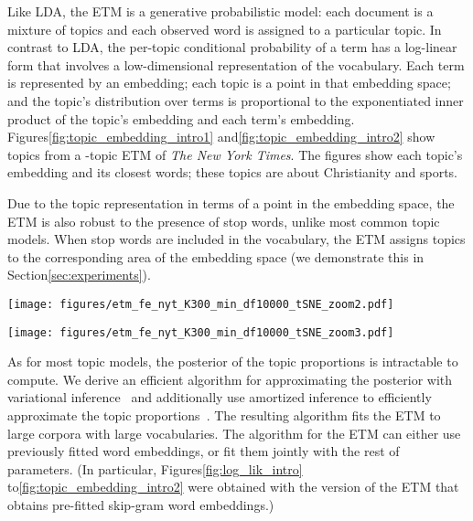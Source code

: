 \documentclass[11pt,a4paper]{article}
\begin{document}
Like \gls{LDA}, the \gls{ETM} is a generative probabilistic model:
each document is a mixture of topics and each observed word is
assigned to a particular topic.  In contrast to \gls{LDA},
the per-topic conditional probability of a term has a log-linear form
that involves a low-dimensional representation of the vocabulary.
Each term is represented by an embedding; each topic is a point in
that embedding space; and the topic's distribution over terms is
proportional to the exponentiated inner product of the topic's
embedding and each term's embedding.  Figures\nobreakspace \ref {fig:topic_embedding_intro1} and\nobreakspace  \ref {fig:topic_embedding_intro2}
show topics from a -topic \gls{ETM} of \textit{The New York Times}. The figures show each topic's embedding and its closest words; these topics are about Christianity and sports.

Due to the topic representation in terms of a point in the embedding space,
the \gls{ETM} is also robust to the presence of stop words, unlike most common
topic models. When stop words are included in the vocabulary, the \gls{ETM}
assigns topics to the corresponding area of the embedding space
(we demonstrate this in Section\nobreakspace \ref {sec:experiments}).

\begin{figure*}[t]
\centering
\begin{minipage}{.45\textwidth}
  \centering
  \texttt{[image: figures/etm\_fe\_nyt\_K300\_min\_df10000\_tSNE\_zoom2.pdf]}
  \label{fig:topic_embedding_intro1}
\end{minipage}\hspace*{1cm}
\begin{minipage}{.45\textwidth}
  \centering
  \texttt{[image: figures/etm\_fe\_nyt\_K300\_min\_df10000\_tSNE\_zoom3.pdf]}
  \label{fig:topic_embedding_intro2}
\end{minipage}
\end{figure*}

As for most topic models, the posterior of the topic
proportions is intractable to compute.  We derive an efficient
algorithm for approximating the posterior with variational
inference~\citep{Jordan1999,Hoffman2013,Blei2017} and additionally use
amortized inference to efficiently approximate the topic
proportions~\citep{kingma2014autoencoding, rezende2014stochastic}. The
resulting algorithm fits the \gls{ETM} to large corpora with large
vocabularies.  The algorithm for the \gls{ETM} can either use previously fitted
word embeddings, or fit them jointly with the rest of parameters.
(In particular, Figures\nobreakspace  \ref {fig:log_lik_intro} to\nobreakspace  \ref {fig:topic_embedding_intro2} 
were obtained with the version of the \gls{ETM} that obtains pre-fitted
skip-gram word embeddings.)
\end{document}
